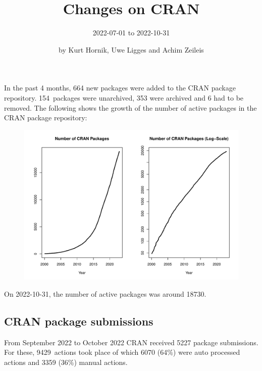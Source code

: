 \title{Changes on CRAN}
\subtitle{2022-07-01 to 2022-10-31}
\author{by Kurt Hornik, Uwe Ligges and Achim Zeileis}
\maketitle

\sloppy


In the past 4 months, 664 new packages were added to the CRAN package
repository.  154~packages were unarchived, 353 were archived and 6 had
to be removed.  The following shows the growth of the number of active
packages in the CRAN package repository:

\begin{figure}[h]
  \centering
  \includegraphics[width=5in]{cran_growth}
\end{figure}

\noindent
On 2022-10-31, the number of active packages was around 18730.



\subsection{CRAN package submissions}

 From September 2022 to October 2022 CRAN received 5227 package submissions.
For these, 9429~actions took place of which 6070 (64\%) were auto 
processed actions and 3359 (36\%) manual actions.

